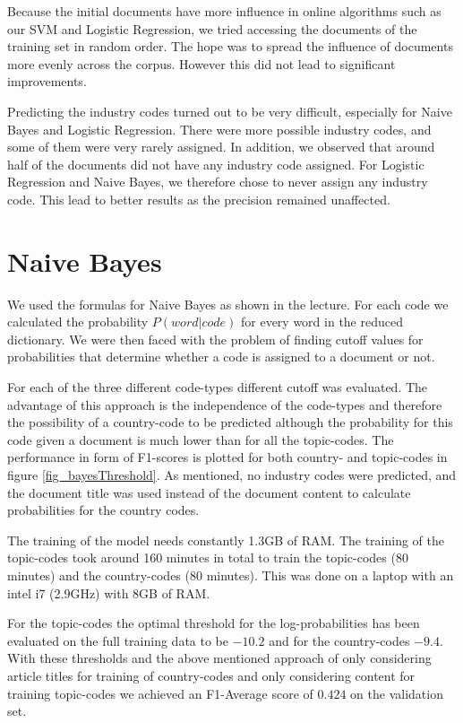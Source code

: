 \documentclass{article}
\begin{document}
Because the initial documents have more influence in online algorithms such as our SVM and Logistic Regression, we tried accessing the documents of the training set in random order. The hope was to spread the influence of documents more evenly across the corpus. However this did not lead to significant improvements.

Predicting the industry codes turned out to be very difficult, especially for Naive Bayes and Logistic Regression. There were more possible industry codes, and some of them were very rarely assigned.  In addition, we observed that around half of the documents did not have any industry code assigned. For Logistic Regression and Naive Bayes, we therefore chose to never assign any industry code. This lead to better results as the precision remained unaffected.

\section*{Naive Bayes}
We used the formulas for Naive Bayes as shown in the lecture. For each code we calculated the probability $P(word | code)$ for every word in the reduced dictionary. We were then faced with the problem of finding cutoff values for probabilities that determine whether a code is assigned to a document or not.

For each of the three different code-types different cutoff was evaluated. The advantage of this approach is the independence of the code-types and therefore the possibility of a country-code to be predicted although the probability for this code given a document is much lower than for all the topic-codes. The performance in form of F1-scores is plotted for both country- and topic-codes in figure \ref{fig_bayesThreshold}. As mentioned, no industry codes were predicted, and the document title was used instead of the document content to calculate probabilities for the country codes.

The training of the model needs constantly 1.3GB of RAM. The training of the topic-codes took around 160 minutes in total to train the topic-codes (80 minutes) and the country-codes (80 minutes). This was done on a laptop with an intel i7 (2.9GHz) with 8GB of RAM.

For the topic-codes the optimal threshold for the log-probabilities has been evaluated on the full training data to be $-10.2$ and for the country-codes $-9.4$. With these thresholds and the above mentioned approach of only considering article titles for training of country-codes and only considering content for training topic-codes we achieved an F1-Average score of $0.424$ on the validation set.
\end{document}
